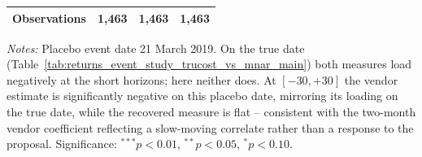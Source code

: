 \documentclass[a4paper,12pt]{article}
\begin{document}
\begin{table}[htbp]
\begin{tabular}{lccc}
Observations & 1,463 & 1,463 & 1,463 \\
\bottomrule
\end{tabular}
\begin{flushleft}\footnotesize
\textit{Notes:} Placebo event date 21 March 2019. On the true date
(Table~\ref{tab:returns_event_study_trucost_vs_mnar_main}) both measures load
negatively at the short horizons; here neither does. At $[-30,+30]$ the vendor
estimate is significantly negative on this placebo date, mirroring its loading on
the true date, while the recovered measure is flat -- consistent with the two-month
vendor coefficient reflecting a slow-moving correlate rather than a response to the
proposal. Significance: $^{***}p<0.01$, $^{**}p<0.05$, $^{*}p<0.10$.
\end{flushleft}
\end{table}
\end{document}
